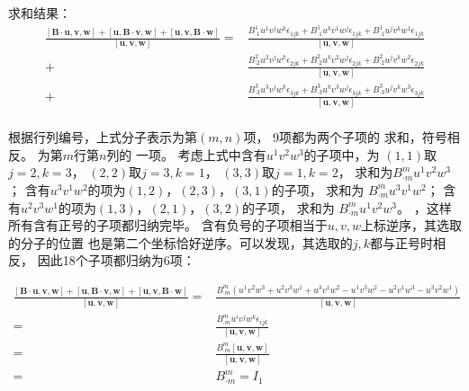 \documentclass[UTF8,zihao=5]{ctexart}
\newcommand{\bm}[1]{{\mathbf{#1}}}
\begin{document}
求和结果：
\begin{equation}
    \begin{aligned}
        \frac{
        [\bm{B}\cdot\bm{u}, \bm{v}, \bm{w}]+
        [\bm{u}, \bm{B}\cdot\bm{v}, \bm{w}]+
        [\bm{u}, \bm{v}, \bm{B}\cdot\bm{w}]}{[\bm{u}, \bm{v}, \bm{w}]}
        = &
        \frac{
        B^1_{\cdot 1}u^1v^jw^k\epsilon_{1jk}+
        B^1_{\cdot 1}u^kv^1w^j\epsilon_{1jk}+
        B^1_{\cdot 1}u^jv^kw^1\epsilon_{1jk}}
        {[\bm{u}, \bm{v}, \bm{w}]} \\
        + &
        \frac{
        B^2_{\cdot 2}u^2v^jw^k\epsilon_{2jk}+
        B^2_{\cdot 2}u^kv^2w^j\epsilon_{2jk}+
        B^2_{\cdot 2}u^jv^kw^2\epsilon_{2jk}}
        {[\bm{u}, \bm{v}, \bm{w}]} \\
        + &
        \frac{
        B^3_{\cdot 3}u^3v^jw^k\epsilon_{3jk}+
        B^3_{\cdot 3}u^kv^3w^j\epsilon_{3jk}+
        B^3_{\cdot 3}u^jv^kw^3\epsilon_{3jk}}
        {[\bm{u}, \bm{v}, \bm{w}]} \\
    \end{aligned}
\end{equation}

根据行列编号，上式分子表示为第$(m,n)$项，
9项都为两个子项的
求和，符号相反。
为第$m$行第$n$列的
一项。
考虑上式中含有$u^1v^2w^3$的子项中，为
$(1,1)$取$j=2,k=3$，
$(2,2)$取$j=3,k=1$，
$(3,3)$取$j=1,k=2$，
求和为$B^m_{\cdot m}u^1v^2w^3$；
含有$u^3v^1w^2$的项为$(1,2)$，$(2,3)$，$(3,1)$的子项，
求和为
$B^m_{\cdot m}u^3v^1w^2$；
含有$u^2v^3w^1$的项为$(1,3)$，$(2,1)$，$(3,2)$的子项，
求和为
$B^m_{\cdot m}u^1v^2w^3$。
，这样所有含有正号的子项都归纳完毕。
含有负号的子项相当于$u,v,w$上标逆序，其选取的分子的位置
也是第二个坐标恰好逆序。可以发现，其选取的$j,k$都与正号时相反，
因此18个子项都归纳为6项：

\begin{equation}
    \begin{aligned}
        \frac{
        [\bm{B}\cdot\bm{u}, \bm{v}, \bm{w}]+
        [\bm{u}, \bm{B}\cdot\bm{v}, \bm{w}]+
        [\bm{u}, \bm{v}, \bm{B}\cdot\bm{w}]}{[\bm{u}, \bm{v}, \bm{w}]}
        = &
        \frac{
        B^m_{\cdot m}
        \left(
        u^1v^2w^3+u^2v^3w^1+u^3v^1w^2-
        u^1v^3w^2-u^2v^1w^3-u^3v^2w^1
        \right)}
        {[\bm{u}, \bm{v}, \bm{w}]} \\
        = &
        \frac{
        B^m_{\cdot m}
        u^iv^jw^k\epsilon_{ijk}}
        {[\bm{u}, \bm{v}, \bm{w}]} \\
        = &
        \frac{
        B^m_{\cdot m}
        [\bm{u}, \bm{v}, \bm{w}]}
        {[\bm{u}, \bm{v}, \bm{w}]} \\
        = &
        B^m_{\cdot m}=I_1
    \end{aligned}
\end{equation}
\end{document}
